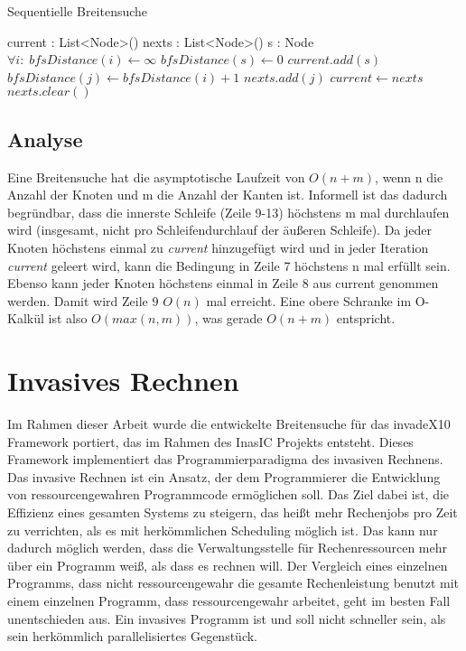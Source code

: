 \begin{algorithm}
	\caption{Sequentielle Breitensuche}
	\label{alg:sequential_bfs}
	\begin{algorithmic}[1]
		\State current : List<Node>()
		\State nexts : List<Node>()
		\State s : Node
		\State  $\forall i: \; bfsDistance(i) \gets \infty$
		\State $bfsDistance(s) \gets 0$
		\State $current.add(s)$
						\State $bfsDistance(j) \gets bfsDistance(i) + 1$
						\State $nexts.add(j)$
					\EndIf
				\EndFor
			\EndFor
			\State $current \gets nexts$
			\State $nexts.clear()$
		\EndWhile
	\end{algorithmic}
\end{algorithm}


\subsection{Analyse} %
\label{sub:analyse}
Eine Breitensuche hat die asymptotische Laufzeit von $O(n + m)$, wenn n die Anzahl der Knoten und m die Anzahl der Kanten ist. Informell ist das dadurch begründbar, dass die innerste Schleife (Zeile 9-13) höchstens m mal durchlaufen wird (insgesamt, nicht pro Schleifendurchlauf der äußeren Schleife). Da jeder Knoten höchstens einmal zu \textit{current} hinzugefügt wird und in jeder Iteration \textit{current} geleert wird, kann die Bedingung in Zeile 7 höchstens n mal erfüllt sein. Ebenso kann jeder Knoten höchstens einmal in Zeile 8 aus current genommen werden. Damit wird Zeile 9 $O(n)$ mal erreicht. Eine obere Schranke im O-Kalkül ist also $O(max(n,m))$, was gerade $O(n + m)$ entspricht.


\section{Invasives Rechnen} %
\label{sec:invasives_rechnen}
Im Rahmen dieser Arbeit wurde die entwickelte Breitensuche für das invadeX10 Framework \cite{SWB-367212986} portiert, das im Rahmen des InasIC Projekts entsteht. Dieses Framework implementiert das Programmierparadigma des invasiven Rechnens. Das invasive Rechnen ist ein Ansatz, der dem Programmierer die Entwicklung von ressourcengewahren Programmcode ermöglichen soll. Das Ziel dabei ist, die Effizienz eines gesamten Systems zu steigern, das heißt mehr Rechenjobs pro Zeit zu verrichten, als es mit herkömmlichen Scheduling möglich ist. Das kann nur dadurch möglich werden, dass die Verwaltungsstelle für Rechenressourcen mehr über ein Programm weiß, als dass es rechnen will. Der Vergleich eines einzelnen Programms, dass nicht ressourcengewahr die gesamte Rechenleistung benutzt mit einem einzelnen Programm, dass ressourcengewahr arbeitet, geht im besten Fall unentschieden aus. Ein invasives Programm ist und soll nicht schneller sein, als sein herkömmlich parallelisiertes Gegenstück.

